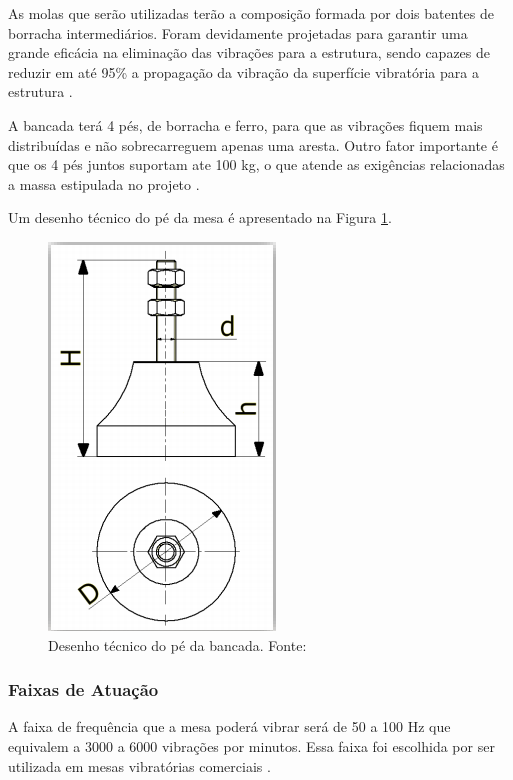 	As molas que serão utilizadas terão a composição formada por dois batentes de borracha intermediários. Foram devidamente projetadas para garantir uma grande eficácia na eliminação das vibrações para a estrutura, sendo capazes de reduzir em até 95\% a propagação da vibração da superfície vibratória para a estrutura \cite{mola_catalogo}.
    
    A bancada terá 4 pés, de borracha e ferro, para que as vibrações fiquem mais distribuídas e não sobrecarreguem apenas uma aresta. Outro fator importante é que os 4 pés juntos suportam ate 100 kg, o que atende as exigências relacionadas a massa estipulada no projeto \cite{ferramentas_kennedy}.
    
    Um desenho técnico do pé da mesa é apresentado na Figura \ref{fig:pe_bancada}.
    
    \begin{figure}[!ht]
      \centering
      \includegraphics[scale=0.5]{figuras/amortecedor.png}
      \caption{Desenho técnico do pé da bancada. Fonte: \cite{mola_catalogo}}
      \label{fig:pe_bancada}
      \end{figure}


\subsubsection*{\textbf{Faixas de Atuação}}
A faixa de frequência que a mesa poderá vibrar será de 50 a 100 Hz que equivalem a 3000 a 6000 vibrações por minutos. Essa faixa foi escolhida por ser utilizada em mesas vibratórias comerciais \cite{ricardo_jose}.

